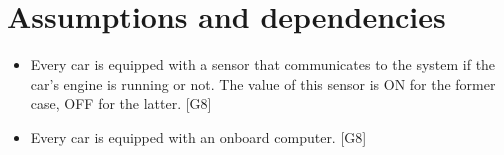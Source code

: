 \section{Assumptions and dependencies}

\begin{itemize}
	\item Every car is equipped with a sensor that communicates to the system if the car's engine is running or not. The value of this sensor is ON for the former case, OFF for the latter. [G8]
	\item Every car is equipped with an onboard computer. [G8]
\end{itemize}